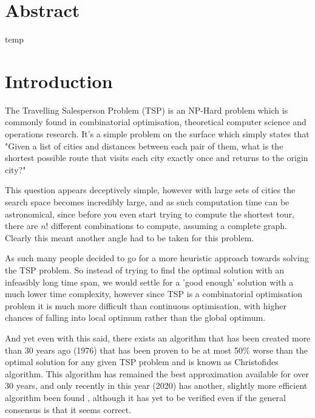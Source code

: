 \documentclass[11pt,a4paper,titlepage]{article}
\author{Alex Campbell}
\date{}
\begin{document}
\setlength{\parindent}{0em}
\setlength{\parskip}{1em}

\section*{Abstract}

temp

\pagebreak
\tableofcontents
\pagebreak

\section{Introduction}

The Travelling Salesperson Problem (TSP) is an NP-Hard problem which is commonly found in combinatorial optimisation, theoretical computer science and operations research. It's a simple problem on the surface which simply states that "Given a list of cities and distances between each pair of them, what is the shortest possible route that visits each city exactly once and returns to the origin city?" \cite{TSPWiki}

This question appears deceptively simple, however with large sets of cities the search space becomes incredibly large, and as such computation time can be astronomical, since before you even start trying to compute the shortest tour, there are $n!$ different combinations to compute, assuming a complete graph. Clearly this meant another angle had to be taken for this problem.

As such many people decided to go for a more heuristic approach towards solving the TSP problem. So instead of trying to find the optimal solution with an infeasibly long time span, we would settle for a 'good enough' solution with a much lower time complexity, however since TSP is a combinatorial optimisation problem it is much more difficult than continuous optimisation, with higher chances of falling into local optimum rather than the global optimum.

And yet even with this said, there exists an algorithm that has been created more than 30 years ago (1976) that has been proven to be at most 50\% worse than the optimal solution for any given TSP problem and is known as Christofides algorithm. This algorithm has remained the best approximation available for over 30 years, and only recently in this year (2020) has another, slightly more efficient algorithm been found \cite{TSP2020}, although it has yet to be verified even if the general consensus is that it seems correct.
\end{document}
